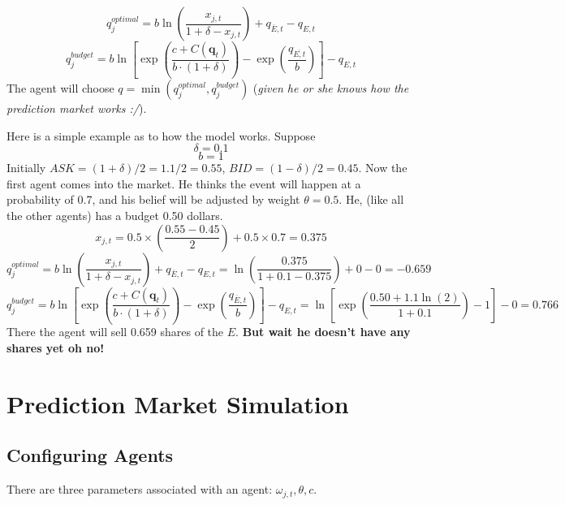 \documentclass{article}
\begin{document}
    \begin{displaymath}
        q_j^{optimal}=b\ln\left({\frac{x_{j,t}}{1+\delta-x_{j,t}}}\right)+q_{\overline{E},t}-q_{E,t}
    \end{displaymath}
    \begin{displaymath}
        q_j^{budget}=b\ln\left[{\exp\left(\frac{c+C(\textbf{q}_t)}{b\cdot (1+\delta)}\right)-\exp\left(\frac{q_{\overline{{E},t}}}{b}\right)}\right]-q_{E,t}
    \end{displaymath}
    The agent will choose $q=\min(q_j^{optimal}, q_j^{budget})$ (\emph{given he or she knows how the prediction market works :/}). 
    
    Here is a simple example as to how the model works. Suppose
    \begin{displaymath}
    \delta = 0.1
    \end{displaymath}
    \begin{displaymath}
    b = 1
    \end{displaymath}
    Initially $ASK=(1+\delta)/2=1.1/2=0.55$, $BID=(1-\delta)/2=0.45$.
    Now the first agent comes into the market. He thinks the event will happen at a probability of 0.7, and his belief will be adjusted by weight $\theta=0.5$. He, (like all the other agents) has a budget 0.50 dollars.
    \begin{displaymath}
    x_{j,t}=0.5\times \left(\frac{0.55-0.45}{2}\right)+0.5\times 0.7=0.375
    \end{displaymath}
    \begin{displaymath}
    q_j^{optimal}=b\ln\left({\frac{x_{j,t}}{1+\delta-x_{j,t}}}\right)+q_{\overline{E},t}-q_{E,t}=\ln\left({\frac{0.375}{1+0.1-0.375}}\right)+0-0=-0.659
    \end{displaymath}
    \begin{displaymath}
    q_j^{budget}=b\ln\left[{\exp\left(\frac{c+C(\textbf{q}_t)}{b\cdot (1+\delta)}\right)-\exp\left(\frac{q_{\overline{{E}},t}}{b}\right)}\right]-q_{E,t}=\ln\left[{\exp\left(\frac{0.50+1.1\ln(2)}{1+0.1}\right)-1}\right]-0=0.766 
    \end{displaymath}
    There the agent will sell 0.659 shares of the $E$. \textbf{But wait he doesn't have any shares yet oh no!}

    \section{Prediction Market Simulation}
        \subsection{Configuring Agents}
        There are three parameters associated with an agent: $\omega_{j,t},\theta,c$.
        
\end{document}
